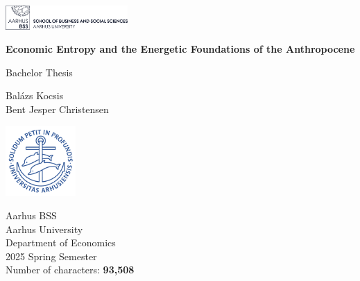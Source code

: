 \documentclass[a4paper,12pt]{article}
\begin{document}
\begin{center}
    \vspace*{0.5cm}

    \includegraphics[width=0.35\textwidth]{bss_logo.png}

    \vspace{1.5cm}

    {\LARGE\textbf{Economic Entropy and the Energetic Foundations of the Anthropocene\\[0.4em]}}

    \vspace{1em}
    {\large Bachelor Thesis}

    \vspace{1.8cm}
    {\Large Balázs Kocsis\\[0.3em]Bent Jesper Christensen}

    \vspace{2.2cm}
    \includegraphics[width=0.20\textwidth]{university_logo.png}

    \vspace{2.2cm}
    \normalsize
    Aarhus BSS\\Aarhus University\\Department of Economics\\2025 Spring Semester\\Number of characters: \textbf{93,508}
\end{center}

\newpage
\pagestyle{plain}

\tableofcontents
\renewcommand{\cftsecindent}{0pt}
\renewcommand{\cftsubsecindent}{1em}
\renewcommand{\cftsubsubsecindent}{2em}
\renewcommand{\cftsecfont}{\bfseries}
\renewcommand{\cftsubsecfont}{\normalfont}
\renewcommand{\cftsubsubsecfont}{\itshape}
\renewcommand{\cftdotsep}{1.5}

\newpage
{}

\end{document}
